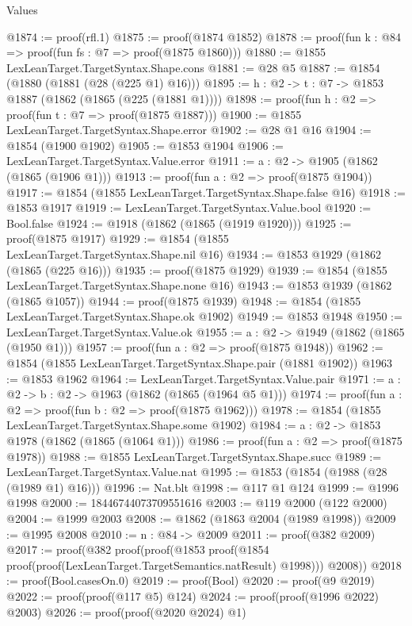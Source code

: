 \begin{lexlean}{Values}
\begin{coremodule}
@1874 := proof(rfl.{1})
@1875 := proof(@1874 @1852)
@1878 := proof(fun {k : @84} => proof(fun {fs : @7} => proof(@1875 @1860)))
@1880 := @1855 LexLeanTarget.TargetSyntax.Shape.cons
@1881 := @28 @5
@1887 := @1854 (@1880 (@1881 (@28 (@225 @1) @16)))
@1895 := {h : @2} -> {t : @7} -> @1853 @1887 (@1862 (@1865 (@225 (@1881 @1))))
@1898 := proof(fun {h : @2} => proof(fun {t : @7} => proof(@1875 @1887)))
@1900 := @1855 LexLeanTarget.TargetSyntax.Shape.error
@1902 := @28 @1 @16
@1904 := @1854 (@1900 @1902)
@1905 := @1853 @1904
@1906 := LexLeanTarget.TargetSyntax.Value.error
@1911 := {a : @2} -> @1905 (@1862 (@1865 (@1906 @1)))
@1913 := proof(fun {a : @2} => proof(@1875 @1904))
@1917 := @1854 (@1855 LexLeanTarget.TargetSyntax.Shape.false @16)
@1918 := @1853 @1917
@1919 := LexLeanTarget.TargetSyntax.Value.bool
@1920 := Bool.false
@1924 := @1918 (@1862 (@1865 (@1919 @1920)))
@1925 := proof(@1875 @1917)
@1929 := @1854 (@1855 LexLeanTarget.TargetSyntax.Shape.nil @16)
@1934 := @1853 @1929 (@1862 (@1865 (@225 @16)))
@1935 := proof(@1875 @1929)
@1939 := @1854 (@1855 LexLeanTarget.TargetSyntax.Shape.none @16)
@1943 := @1853 @1939 (@1862 (@1865 @1057))
@1944 := proof(@1875 @1939)
@1948 := @1854 (@1855 LexLeanTarget.TargetSyntax.Shape.ok @1902)
@1949 := @1853 @1948
@1950 := LexLeanTarget.TargetSyntax.Value.ok
@1955 := {a : @2} -> @1949 (@1862 (@1865 (@1950 @1)))
@1957 := proof(fun {a : @2} => proof(@1875 @1948))
@1962 := @1854 (@1855 LexLeanTarget.TargetSyntax.Shape.pair (@1881 @1902))
@1963 := @1853 @1962
@1964 := LexLeanTarget.TargetSyntax.Value.pair
@1971 := {a : @2} -> {b : @2} -> @1963 (@1862 (@1865 (@1964 @5 @1)))
@1974 := proof(fun {a : @2} => proof(fun {b : @2} => proof(@1875 @1962)))
@1978 := @1854 (@1855 LexLeanTarget.TargetSyntax.Shape.some @1902)
@1984 := {a : @2} -> @1853 @1978 (@1862 (@1865 (@1064 @1)))
@1986 := proof(fun {a : @2} => proof(@1875 @1978))
@1988 := @1855 LexLeanTarget.TargetSyntax.Shape.succ
@1989 := LexLeanTarget.TargetSyntax.Value.nat
@1995 := @1853 (@1854 (@1988 (@28 (@1989 @1) @16)))
@1996 := Nat.blt
@1998 := @117 @1 @124
@1999 := @1996 @1998
@2000 := 18446744073709551616
@2003 := @119 @2000 (@122 @2000)
@2004 := @1999 @2003
@2008 := @1862 (@1863 @2004 (@1989 @1998))
@2009 := @1995 @2008
@2010 := {n : @84} -> @2009
@2011 := proof(@382 @2009)
@2017 := proof(@382
      proof(proof(@1853 proof(@1854 proof(proof(LexLeanTarget.TargetSemantics.natResult) @1998)))
          @2008))
@2018 := proof(Bool.casesOn.{0})
@2019 := proof(Bool)
@2020 := proof(@9 @2019)
@2022 := proof(proof(@117 @5) @124)
@2024 := proof(proof(@1996 @2022) @2003)
@2026 := proof(proof(@2020 @2024) @1)

\end{coremodule}
\end{lexlean}

